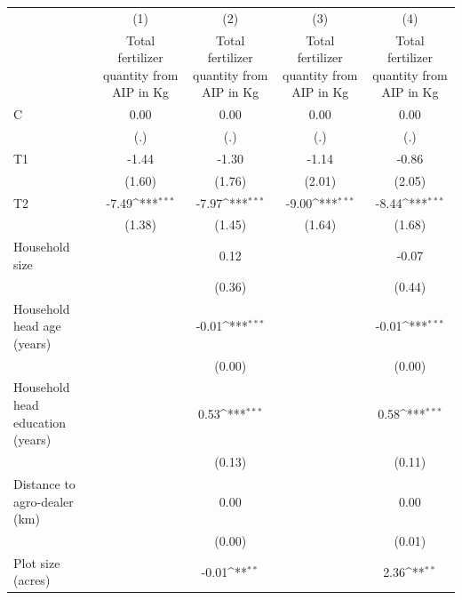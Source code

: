{
\def\sym#1{\ifmmode^{#1}\else\(^{#1}\)\fi}
\begin{tabular}{l*{4}{c}}
\hline\hline
                &\multicolumn{1}{c}{(1)}&\multicolumn{1}{c}{(2)}&\multicolumn{1}{c}{(3)}&\multicolumn{1}{c}{(4)}\\
                &\multicolumn{1}{c}{Total fertilizer quantity from AIP in Kg}&\multicolumn{1}{c}{Total fertilizer quantity from AIP in Kg}&\multicolumn{1}{c}{Total fertilizer quantity from AIP in Kg}&\multicolumn{1}{c}{Total fertilizer quantity from AIP in Kg}\\
\hline
C               &     0.00         &     0.00         &     0.00         &     0.00         \\
                &      (.)         &      (.)         &      (.)         &      (.)         \\
T1              &    -1.44         &    -1.30         &    -1.14         &    -0.86         \\
                &   (1.60)         &   (1.76)         &   (2.01)         &   (2.05)         \\
T2              &    -7.49\sym{***}&    -7.97\sym{***}&    -9.00\sym{***}&    -8.44\sym{***}\\
                &   (1.38)         &   (1.45)         &   (1.64)         &   (1.68)         \\
Household size  &                  &     0.12         &                  &    -0.07         \\
                &                  &   (0.36)         &                  &   (0.44)         \\
Household head age (years)&                  &    -0.01\sym{***}&                  &    -0.01\sym{***}\\
                &                  &   (0.00)         &                  &   (0.00)         \\
Household head education (years)&                  &     0.53\sym{***}&                  &     0.58\sym{***}\\
                &                  &   (0.13)         &                  &   (0.11)         \\
Distance to agro-dealer (km)&                  &     0.00         &                  &     0.00         \\
                &                  &   (0.00)         &                  &   (0.01)         \\
Plot size (acres)&                  &    -0.01\sym{**} &                  &     2.36\sym{**} \\

\end{tabular}}
